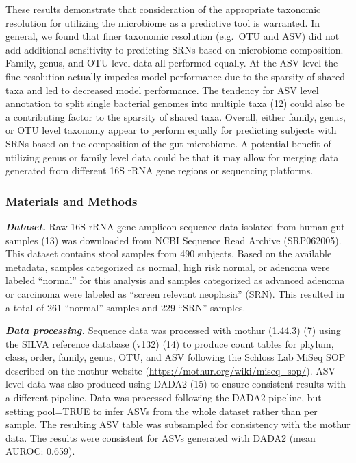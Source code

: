 \documentclass[]{article}
\begin{document}
These results demonstrate that consideration of the appropriate
taxonomic resolution for utilizing the microbiome as a predictive tool
is warranted. In general, we found that finer taxonomic resolution
(e.g.~OTU and ASV) did not add additional sensitivity to predicting SRNs
based on microbiome composition. Family, genus, and OTU level data all
performed equally. At the ASV level the fine resolution actually impedes
model performance due to the sparsity of shared taxa and led to
decreased model performance. The tendency for ASV level annotation to
split single bacterial genomes into multiple taxa (12) could also be a
contributing factor to the sparsity of shared taxa. Overall, either
family, genus, or OTU level taxonomy appear to perform equally for
predicting subjects with SRNs based on the composition of the gut
microbiome. A potential benefit of utilizing genus or family level data
could be that it may allow for merging data generated from different 16S
rRNA gene regions or sequencing platforms.

\subsubsection{Materials and Methods}\label{materials-and-methods}

\textbf{\emph{Dataset.}} Raw 16S rRNA gene amplicon sequence data
isolated from human gut samples (13) was downloaded from NCBI Sequence
Read Archive (SRP062005). This dataset contains stool samples from 490
subjects. Based on the available metadata, samples categorized as
normal, high risk normal, or adenoma were labeled ``normal'' for this
analysis and samples categorized as advanced adenoma or carcinoma were
labeled as ``screen relevant neoplasia'' (SRN). This resulted in a total
of 261 ``normal'' samples and 229 ``SRN'' samples.

\textbf{\emph{Data processing.}} Sequence data was processed with mothur
(1.44.3) (7) using the SILVA reference database (v132) (14) to produce
count tables for phylum, class, order, family, genus, OTU, and ASV
following the Schloss Lab MiSeq SOP described on the mothur website
(\url{https://mothur.org/wiki/miseq_sop/}). ASV level data was also
produced using DADA2 (15) to ensure consistent results with a different
pipeline. Data was processed following the DADA2 pipeline, but setting
pool=TRUE to infer ASVs from the whole dataset rather than per sample.
The resulting ASV table was subsampled for consistency with the mothur
data. The results were consistent for ASVs generated with DADA2 (mean
AUROC: 0.659).
\end{document}
